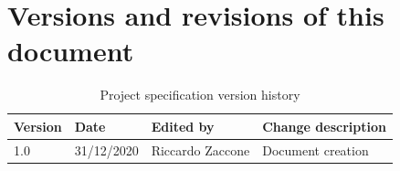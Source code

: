 
\chapter*{Versions and revisions of this document }

\begin{table}[hb]
    \centering
    \begin{tabular}{llp{}p{}}
    \toprule
    Version & Date & Edited by & Change description \\
    \midrule
         1.0 & 31/12/2020 & Riccardo Zaccone & Document creation  \\
    \bottomrule
    \end{tabular}
    \caption{Project specification version history}
    \label{tab:change_history}
\end{table}